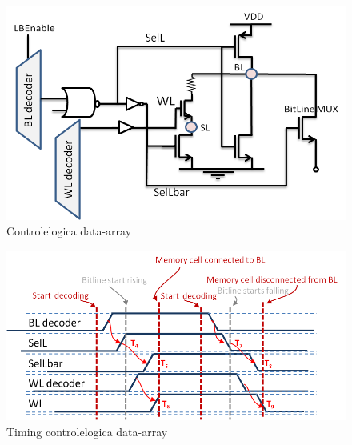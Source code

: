 \begin{figure}[!ht]
  \centering
  \includegraphics[scale=0.6]{../fig/hfdstk-timing-lbcell1.png}
  \caption[Data-array:logica]{Controlelogica data-array}
  \label{fig:lbcell_timing1}
\end{figure}

\begin{figure}[!ht]
  \centering
  \includegraphics[scale=0.9]{../fig/hfdstk-timing-lbcell2.png}
  \caption[Data-array:timing]{Timing controlelogica data-array}
  \label{fig:lbcell_timing2}
\end{figure}

